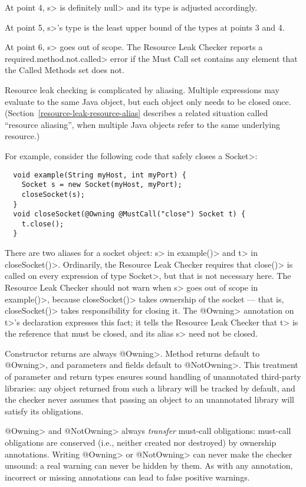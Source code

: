 At point 4, \<s> is definitely \<null> and its type is adjusted accordingly.

At point 5, \<s>'s type is the least upper bound of the types at points 3
and 4.

At point 6, \<s> goes out of scope.  The Resource Leak Checker reports a
\<required.method.not.called> error if the Must Call set contains any
element that the Called Methods set does not.



Resource leak checking is complicated by aliasing.  Multiple expressions
may evaluate to the same Java object, but each object only needs to be
closed once.  (Section~\ref{resource-leak-resource-alias} describes a
related situation called ``resource aliasing'', when multiple Java objects
refer to the same underlying resource.)

For example, consider the following code that safely closes a \<Socket>:

\begin{verbatim}
  void example(String myHost, int myPort) {
    Socket s = new Socket(myHost, myPort);
    closeSocket(s);
  }
  void closeSocket(@Owning @MustCall("close") Socket t) {
    t.close();
  }
\end{verbatim}

There are two aliases for a socket object: \<s> in \<example()> and \<t> in
\<closeSocket()>.  Ordinarily, the Resource Leak Checker requires that
\<close()> is called on every expression of type \<Socket>, but that is not
necessary here.  The Resource Leak Checker should not warn when
\<s> goes out of scope in \<example()>, because \<closeSocket()> takes ownership
of the socket --- that is, \<closeSocket()> takes responsibility for closing
it. The \<@Owning> annotation on \<t>'s declaration expresses this fact; it
tells the Resource Leak Checker that \<t> is the reference that must be
closed, and its alias \<s> need not be closed.

Constructor returns are always \<@Owning>.
Method returns default to \<@Owning>,
and parameters and fields default to \<@NotOwning>. This treatment of parameter and
return types ensures sound handling of unannotated third-party libraries: any
object returned from such a library will be tracked by default, and the checker
never assumes that passing an object to an unannotated library will satisfy its obligations.

\<@Owning> and \<@NotOwning> always \emph{transfer} must-call obligations: must-call
obligations are conserved (i.e., neither created nor destroyed) by ownership annotations.
Writing \<@Owning> or \<@NotOwning> can never make the checker
unsound:  a real warning can never be hidden by them.
As with any annotation, incorrect or missing annotations can lead to false positive warnings.


